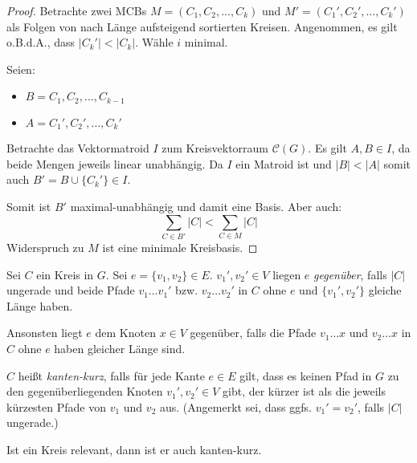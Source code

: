 \begin{proof}
    Betrachte zwei MCBs $ M = (C_1, C_2, \dots, C_k) $ und $ M' = (C_1', C_2', \dots, C_k') $ als Folgen von nach Länge aufsteigend sortierten Kreisen.
    Angenommen, es gilt o.B.d.A., dass $ |C_k'|<|C_k| $.
    Wähle $ i $ minimal.

    Seien:
    \begin{itemize}
        \item $ B = { C_1, C_2, \dots, C_{k - 1} } $
        \item $ A = { C_1', C_2', \dots, C_k' } $
    \end{itemize}

    Betrachte das Vektormatroid $ I $ zum Kreisvektorraum $ \mathcal{C}(G) $.
    Es gilt $ A, B \in I $, da beide Mengen jeweils linear unabhängig.
    Da $ I $ ein Matroid ist und $ |B| < |A| $ somit auch $ B' = B \cup \{ C_k' \} \in I $.

    Somit ist $ B' $ maximal-unabhängig und damit eine Basis.
    Aber auch:
    \begin{equation*}
        \sum_{C \in B'} |C| < \sum_{C \in M} |C|
    \end{equation*}
    Widerspruch zu $ M $ ist eine minimale Kreisbasis.
\end{proof}

\begin{definition}
    Sei $ C $ ein Kreis in $ G $.
    Sei $ e = \{ v_1, v_2 \} \in E $.
    $ v_1', v_2' \in V $ liegen $ e $ \textit{gegenüber}, falls $ |C| $ ungerade und beide Pfade $ v_1 \dots v_1' $ bzw. $ v_2 \dots v_2' $ in $ C $ ohne $ e $ und $ \{ v_1', v_2' \} $ gleiche Länge haben.

    Ansonsten liegt $ e $ dem Knoten $ x \in V $ gegenüber, falls die Pfade $ v_1 \dots x $ und $ v_2 \dots x $ in $ C $ ohne $ e $ haben gleicher Länge sind.

    $ C $ heißt \textit{kanten-kurz}, falls für jede Kante $ e \in E $ gilt, dass es keinen Pfad in $ G $ zu den gegenüberliegenden Knoten $ v_1', v_2' \in V $ gibt, der kürzer ist als die jeweils kürzesten Pfade von $ v_1 $ und $ v_2 $ aus.
    (Angemerkt sei, dass ggfs. $ v_1' = v_2' $, falls $ |C| $ ungerade.)
\end{definition}

\begin{proposition}
    Ist ein Kreis relevant, dann ist er auch kanten-kurz.
\end{proposition}
